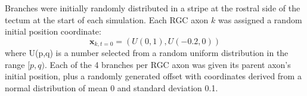 \documentclass[11pt, a4paper, draft]{article}
\begin{document}
Branches were initially randomly distributed in a stripe at the rostral side
of the tectum at the start of each simulation. Each RGC axon $k$ was assigned a
random initial position coordinate:
\begin{equation}\label{e:ic}
\mathbf{x}_{k,t=0} = (U(0,1), U(-0.2,0))
\end{equation}
where U(p,q) is a number selected from a random uniform distribution in the
range $[p,q)$. Each of the 4 branches per RGC axon was given its parent
axon's initial position, plus a randomly generated offset with coordinates
derived from a normal distribution of mean 0 and standard deviation 0.1.
\end{document}
